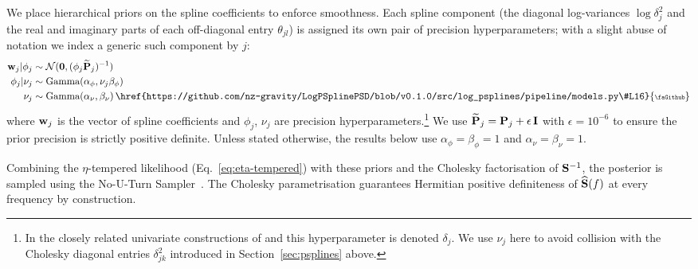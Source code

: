\documentclass[%
	reprint,
	nofootinbib,
	amsmath,
	amssymb,
	aps,
]{revtex4-2}
\DeclareRobustCommand{\codelink}[1]{\,\href{#1}{\mbox{\scalebox{0.65}{\faGithub}}}}
\renewcommand{\S}{{\bf S}}
\begin{document}
	We place hierarchical priors on the spline coefficients to enforce smoothness.
	Each spline component (the diagonal log-variances $\log\delta_{j}^{2}$ and
	the real and imaginary parts of each off-diagonal entry $\theta_{jl}$) is
	assigned its own pair of precision hyperparameters; with a slight abuse of
	notation we index a generic such component by $j$:
	\begin{align}
		\bold{w}_{j} | \phi_{j} & \sim \mathcal{N}(\bold{0}, (\phi_{j} \widetilde{\bold{P}}_{j})^{-1})  \\
		\phi_{j} | \nu_{j}   & \sim \text{Gamma}(\alpha_{\phi}, \nu_{j} \beta_{\phi}) \\
		\nu_{j}              & \sim \text{Gamma}(\alpha_{\nu}, \beta_{\nu})
		\codelink{https://github.com/nz-gravity/LogPSplinePSD/blob/v0.1.0/src/log_psplines/pipeline/models.py\#L16}
	\end{align}
	where $\bold{w}_{j}$ is the vector of spline coefficients and
	$\phi_{j}$, $\nu_{j}$ are precision hyperparameters.\footnote{In the
	closely related univariate constructions of
	\citet{maturana-russel_bayesian_2021} and \citet{aimen2026lisa}
	this hyperparameter is denoted $\delta_{j}$. 
	We use $\nu_{j}$ here to
	avoid collision with the Cholesky diagonal entries $\delta_{jk}^{2}$
	introduced in Section~\ref{sec:psplines} above.}
	We use $\widetilde{\bold{P}}_{j}=\bold{P}_{j}+\epsilon\,\mathbf{I}$ with
	$\epsilon=10^{-6}$ to ensure the prior precision is strictly positive
	definite. Unless stated otherwise, the results below use
	$\alpha_{\phi}=\beta_{\phi}=1$ and
	$\alpha_{\nu}=\beta_{\nu}=1$.

	Combining the $\eta$-tempered likelihood
	(Eq.~\ref{eq:eta-tempered}) with these priors and the Cholesky
	factorisation of $\S^{-1}$, the posterior is sampled using the No-U-Turn
	Sampler~\citep[NUTS;][]{hoffman2014_NUTS}. The Cholesky parametrisation
	guarantees Hermitian positive definiteness of $\widehat{\S}(f)$ at every
	frequency by construction.
\end{document}
